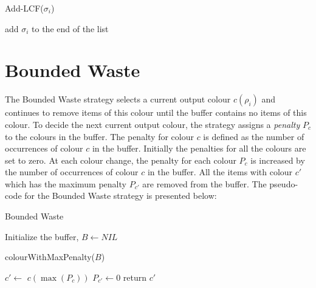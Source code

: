 \begin{function*}
\caption{Add-LCF($\sigma_i$)}
\label{addlcf}
add $\sigma_i$ to the end of the list \;
\end{function*}

\section{Bounded Waste} \label{bw}
The Bounded Waste strategy selects a current output colour $c(\rho_i)$ and
continues to remove items of this colour until the buffer contains no items 
of this colour. To decide the next current output colour, the strategy assigns a 
\textit{penalty} $P_c$ to the colours in the buffer. The penalty for colour $c$
is defined as the number of occurrences of colour $c$ in the buffer. Initially
the penalties for all the colours are set to zero. At each colour change, the
penalty for each colour $P_c$ is increased by the number of occurrences of
colour $c$ in the buffer. All the items with colour $c'$ which has the
maximum penalty $P_{c'}$ are removed from the buffer. The pseudo-code for the
Bounded Waste strategy is presented below:

\begin{algorithm}
\caption{Bounded Waste}
\label{boundedwaste}
Initialize the buffer, $B \gets NIL$ \;
\end{algorithm}

\begin{function*}
\caption{colourWithMaxPenalty($B$)}
\label{penalty}
$c' \gets$ $c(\max(P_c))$ \;
$P_{c'} \gets 0$ \;
return $c'$ \;
\end{function*}

